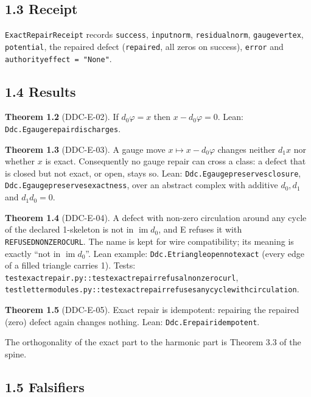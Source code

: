 \documentclass[
  11pt,
]{article}
\renewcommand{\_}{\ddcunderscore\allowbreak}
\begin{document}
\subsection{1.3 Receipt}\label{receipt}

\texttt{Exact\allowbreak Repair\allowbreak Receipt} records \texttt{success},
\texttt{input\_norm}, \texttt{residual\_norm}, \texttt{gauge\_vertex},
\texttt{potential}, the repaired defect (\texttt{repaired}, all zeros on
success), \texttt{error} and \texttt{authority\_effect\ =\ "None"}.

\subsection{1.4 Results}\label{results}

\textbf{Theorem 1.2} (DDC-E-02). If \(d_0 \varphi = x\) then
\(x - d_0 \varphi = 0\). Lean:
\texttt{Ddc.\allowbreak E\_gauge\_repair\_discharges}.

\textbf{Theorem 1.3} (DDC-E-03). A gauge move
\(x \mapsto x - d_0 \varphi\) changes neither \(d_1 x\) nor whether
\(x\) is exact. Consequently no gauge repair can cross a class: a defect
that is closed but not exact, or open, stays so. Lean:
\texttt{Ddc.\allowbreak E\_gauge\_preserves\_closure},
\texttt{Ddc.\allowbreak E\_gauge\_preserves\_exactness}, over an abstract complex
with additive \(d_0, d_1\) and \(d_1 d_0 = 0\).

\textbf{Theorem 1.4} (DDC-E-04). A defect with non-zero circulation
around any cycle of the declared 1-skeleton is not in
\(\operatorname{im} d_0\), and E refuses it with
\texttt{REFUSED\_NON\_ZERO\_CURL}. The name is kept for wire
compatibility; its meaning is exactly ``not in
\(\operatorname{im} d_0\)''. Lean example:
\texttt{Ddc.\allowbreak E\_triangle\_open\_not\_exact} (every edge of a filled
triangle carries 1). Tests:
\texttt{test\_exact\_repair.\allowbreak py::test\_exact\_repair\_refusal\_non\_zero\_curl},
\texttt{test\_letter\_modules.\allowbreak py::test\_exact\_repair\_refuses\_any\_cycle\_with\_circulation}.

\textbf{Theorem 1.5} (DDC-E-05). Exact repair is idempotent: repairing
the repaired (zero) defect again changes nothing. Lean:
\texttt{Ddc.\allowbreak E\_repair\_idempotent}.

The orthogonality of the exact part to the harmonic part is Theorem 3.3
of the spine.

\subsection{1.5 Falsifiers}\label{falsifiers}
\end{document}

